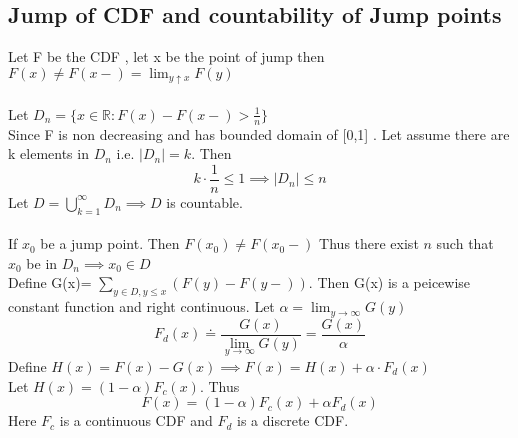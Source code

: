 \documentclass{article}
\begin{document}
\subsection{Jump of CDF and countability of Jump points}
Let F be the CDF , let x be the point of jump then $F(x) \not= F(x-) = \lim_{y\uparrow x} F(y)$
\\ \\ Let $D_n = \{ x \in \mathbb{R} : F(x) - F(x- ) >\frac{1}{n}\} $
\\ Since F is non decreasing and has bounded domain of [0,1] . Let assume there are k elements in $D_n$ i.e. $\vert D_n\vert = k$. Then $$k \cdot \frac{1}{n} \leq 1 \implies |D_n| \leq n $$
 Let $D= \bigcup_{k=1}^{\infty} D_n  \implies D$ is countable. 
 \\ \\
 If $x_0$ be a jump point. Then $F(x_0)\not= F(x_0-) $ Thus there exist $n$ such that  $x_0$ be in $D_n \implies x_0 \in D $
 \\ Define G(x)= $\sum_{y \in D ,y \leq x} (F(y)-F(y-))$. Then G(x) is a peicewise constant function and right continuous. Let $\alpha = \lim_{y \to \infty} G(y)$ 
 $$F_d(x) \doteq \frac{G(x)}{\lim_{y \to \infty} G(y)} =    \frac{G(x)}{\alpha}$$
 Define $H(x) = F(x)- G(x) \implies F(x) = H(x) + \alpha \cdot F_d(x)$
 \\ Let $H(x) = (1-\alpha) F_c(x)$. Thus $$F(x) = (1-\alpha)F_c(x) + \alpha F_d(x) $$
 Here $F_c $ is a continuous CDF and $F_d$ is a discrete CDF.  
\end{document}

